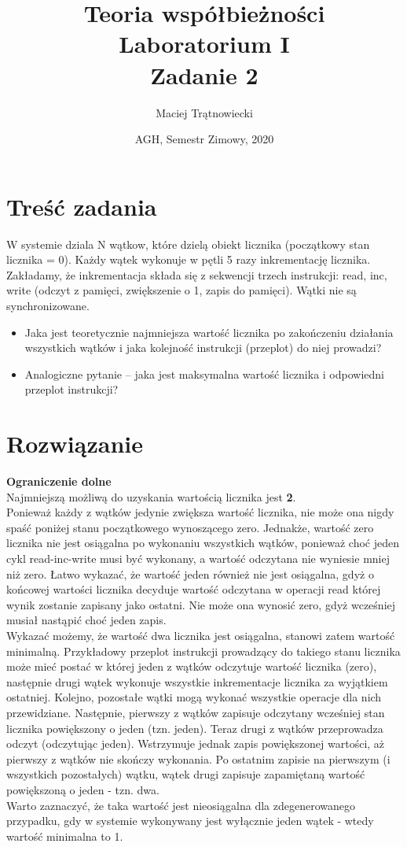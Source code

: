 \documentclass{article}
\title{Teoria współbieżności\\ 
Laboratorium I\\
Zadanie 2}
\author{Maciej Trątnowiecki}
\date{AGH, Semestr Zimowy, 2020}
\begin{document}
    \maketitle
    \section{Treść zadania}
        W systemie dziala N wątkow, które dzielą obiekt licznika (początkowy stan licznika = 0). Każdy wątek wykonuje w pętli 5 razy inkrementację licznika. Zakładamy, że inkrementacja składa się z sekwencji trzech instrukcji: read, inc, write (odczyt z pamięci, zwiększenie o 1, zapis do pamięci). Wątki nie są synchronizowane.
        \begin{itemize}
            \item Jaka jest teoretycznie najmniejsza wartość licznika po zakończeniu działania wszystkich wątków i jaka kolejność instrukcji (przeplot) do niej prowadzi?
            \item Analogiczne pytanie -- jaka jest maksymalna wartość licznika i odpowiedni przeplot instrukcji?
        \end{itemize}
        
    \section{Rozwiązanie}
        \textbf{Ograniczenie dolne}\\
        Najmniejszą możliwą do uzyskania wartością licznika jest \textbf{2}.\\
        Ponieważ każdy z wątków jedynie zwiększa wartość licznika, nie może ona nigdy spaść poniżej stanu początkowego wynoszącego zero. Jednakże, wartość zero licznika nie jest osiągalna po wykonaniu wszystkich wątków, ponieważ choć jeden cykl read-inc-write musi być wykonany, a wartość odczytana nie wyniesie mniej niż zero. Łatwo wykazać, że wartość jeden również nie jest osiągalna, gdyż o końcowej wartości licznika decyduje wartość odczytana w operacji read której wynik zostanie zapisany jako ostatni. Nie może ona wynosić zero, gdyż wcześniej musiał nastąpić choć jeden zapis.\\
        Wykazać możemy, że wartość dwa licznika jest osiągalna, stanowi zatem wartość minimalną. Przykładowy przeplot instrukcji prowadzący do takiego stanu licznika może mieć postać w której jeden z wątków odczytuje wartość licznika (zero), następnie drugi wątek wykonuje wszystkie inkrementacje licznika za wyjątkiem ostatniej. Kolejno, pozostałe wątki mogą wykonać wszystkie operacje dla nich przewidziane. Następnie, pierwszy z wątków zapisuje odczytany wcześniej stan licznika powiększony o jeden (tzn. jeden). Teraz drugi z wątków przeprowadza odczyt (odczytując jeden). Wstrzymuje jednak zapis powiększonej wartości, aż pierwszy z wątków nie skończy wykonania. Po ostatnim zapisie na pierwszym (i wszystkich pozostałych) wątku, wątek drugi zapisuje zapamiętaną wartość powiększoną o jeden - tzn. dwa. \\
        Warto zaznaczyć, że taka wartość jest nieosiągalna dla zdegenerowanego przypadku, gdy w systemie wykonywany jest wyłącznie jeden wątek - wtedy wartość minimalna to 1. 
        
\end{document}
